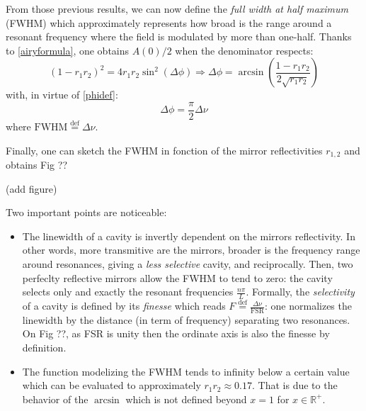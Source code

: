 \documentclass[12pt]{report}
\begin{document}
From those previous results, we can now define the \textit{full width at half maximum} (FWHM) which approximately represents how broad is the range around a resonant frequency where the field is modulated by more than one-half. Thanks to \eqref{airyformula}, one obtains $ A(0) / 2$ when the denominator respects:
\begin{equation}
(1 - r_1 r_2)^2 = 4 r_1 r_2 \sin^2(\Delta\phi) \Rightarrow \Delta\phi = \arcsin \left(\frac{1 - r_1 r_2}{2\sqrt{r_1r_2}} \right)
\end{equation}
with, in virtue of \eqref{phidef}:
\begin{equation}
\Delta\phi = \frac{\pi}{2}\Delta\nu
\end{equation}
where $\textrm{FWHM} \stackrel{\text{def}}{=} \Delta\nu$.

Finally, one can sketch the FWHM in fonction of the mirror reflectivities $r_{1,2}$ and obtains Fig ??

(add figure)

Two important points are noticeable:
\begin{itemize}
	\item The linewidth of a cavity is invertly dependent on the mirrors reflectivity. In other words, more transmitive are the mirrors, broader is the frequency range around resonances, giving a \textit{less selective} cavity, and reciprocally. Then, two perfeclty reflective mirrors allow the FWHM to tend to zero: the cavity selects only and exactly the resonant frequencies $\frac{n\pi}{L}$. Formally, the \textit{selectivity} of a cavity is defined by its \textit{finesse} which reads $F \stackrel{\text{def}}{=} \frac{\Delta\nu}{\textrm{FSR}}$: one normalizes the linewidth by the distance (in term of frequency) separating two resonances. On Fig ??, as FSR is unity then the ordinate axis is also the finesse by definition.
	\item The function modelizing the FWHM tends to infinity below a certain value which can be evaluated to approximately $r_1r_2 \approx 0.17$. That is due to the behavior of the $\arcsin$ which is not defined beyond $x=1$ for $x \in \mathbb{R}^+$. 
\end{itemize}
\end{document}
